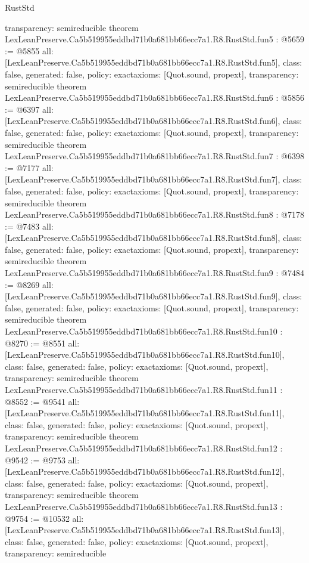 \begin{lexlean}{RustStd}
\begin{coremodule}
{  transparency: semireducible
}
theorem LexLeanPreserve.Ca5b519955eddbd71b0a681bb66ecc7a1.R8.RustStd.fun5 : @5659 := @5855 {
  all: [LexLeanPreserve.Ca5b519955eddbd71b0a681bb66ecc7a1.R8.RustStd.fun5],
  class: false,
  generated: false,
  policy: exact{axioms: [Quot.sound, propext]},
  transparency: semireducible
}
theorem LexLeanPreserve.Ca5b519955eddbd71b0a681bb66ecc7a1.R8.RustStd.fun6 : @5856 := @6397 {
  all: [LexLeanPreserve.Ca5b519955eddbd71b0a681bb66ecc7a1.R8.RustStd.fun6],
  class: false,
  generated: false,
  policy: exact{axioms: [Quot.sound, propext]},
  transparency: semireducible
}
theorem LexLeanPreserve.Ca5b519955eddbd71b0a681bb66ecc7a1.R8.RustStd.fun7 : @6398 := @7177 {
  all: [LexLeanPreserve.Ca5b519955eddbd71b0a681bb66ecc7a1.R8.RustStd.fun7],
  class: false,
  generated: false,
  policy: exact{axioms: [Quot.sound, propext]},
  transparency: semireducible
}
theorem LexLeanPreserve.Ca5b519955eddbd71b0a681bb66ecc7a1.R8.RustStd.fun8 : @7178 := @7483 {
  all: [LexLeanPreserve.Ca5b519955eddbd71b0a681bb66ecc7a1.R8.RustStd.fun8],
  class: false,
  generated: false,
  policy: exact{axioms: [Quot.sound, propext]},
  transparency: semireducible
}
theorem LexLeanPreserve.Ca5b519955eddbd71b0a681bb66ecc7a1.R8.RustStd.fun9 : @7484 := @8269 {
  all: [LexLeanPreserve.Ca5b519955eddbd71b0a681bb66ecc7a1.R8.RustStd.fun9],
  class: false,
  generated: false,
  policy: exact{axioms: [Quot.sound, propext]},
  transparency: semireducible
}
theorem LexLeanPreserve.Ca5b519955eddbd71b0a681bb66ecc7a1.R8.RustStd.fun10 : @8270 := @8551 {
  all: [LexLeanPreserve.Ca5b519955eddbd71b0a681bb66ecc7a1.R8.RustStd.fun10],
  class: false,
  generated: false,
  policy: exact{axioms: [Quot.sound, propext]},
  transparency: semireducible
}
theorem LexLeanPreserve.Ca5b519955eddbd71b0a681bb66ecc7a1.R8.RustStd.fun11 : @8552 := @9541 {
  all: [LexLeanPreserve.Ca5b519955eddbd71b0a681bb66ecc7a1.R8.RustStd.fun11],
  class: false,
  generated: false,
  policy: exact{axioms: [Quot.sound, propext]},
  transparency: semireducible
}
theorem LexLeanPreserve.Ca5b519955eddbd71b0a681bb66ecc7a1.R8.RustStd.fun12 : @9542 := @9753 {
  all: [LexLeanPreserve.Ca5b519955eddbd71b0a681bb66ecc7a1.R8.RustStd.fun12],
  class: false,
  generated: false,
  policy: exact{axioms: [Quot.sound, propext]},
  transparency: semireducible
}
theorem LexLeanPreserve.Ca5b519955eddbd71b0a681bb66ecc7a1.R8.RustStd.fun13 : @9754 := @10532 {
  all: [LexLeanPreserve.Ca5b519955eddbd71b0a681bb66ecc7a1.R8.RustStd.fun13],
  class: false,
  generated: false,
  policy: exact{axioms: [Quot.sound, propext]},
  transparency: semireducible
}
\end{coremodule}
\end{lexlean}
